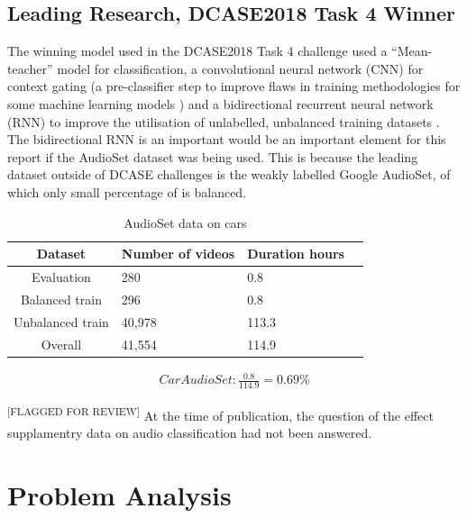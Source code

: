 \documentclass{UoNMCHA}
\newcommand{\flagforreview}{\textsuperscript{\color{red} [FLAGGED FOR REVIEW]}}
\numberwithin{equation}{section}
\begin{document}
\subsection{Leading Research, DCASE2018 Task 4 Winner}
The winning model used in the DCASE2018 Task 4 challenge used a “Mean-teacher” model for classification, a convolutional neural network (CNN) for context gating (a pre-classifier step to improve flaws in training methodologies for some machine learning models \cite{Yan16}) and a bidirectional recurrent neural network (RNN) to improve the utilisation of unlabelled, unbalanced training datasets \cite{winners}. The bidirectional RNN is an important would be an important element for this report if the AudioSet dataset was being used. This is because the leading dataset outside of DCASE challenges is the weakly labelled Google AudioSet, of which only small percentage of is balanced.

\begin{table}[h!]
    \begin{center}
        \caption{AudioSet data on cars}\label{tab:AudioSetCars}
        {\footnotesize
            \begin{tabular}{c l l l|}
                \hline\hline Dataset & Number of videos & Duration hours \\ \hline 
                Evaluation & 280 & 0.8 \\
                Balanced train & 296 & 0.8 \\
                Unbalanced train & 40,978 & 113.3 \\
                Overall & 41,554 & 114.9 \\
                \hline
            \end{tabular}
        }
    \end{center}
\end{table}
\begin{gather*}
    Car AudioSet:  \frac{0.8}{114.9}=0.69\%
\end{gather*}



\flagforreview
At the time of publication, the question of the effect supplamentry data on audio classification had not been answered.





\clearpage \section{Problem Analysis}\label{sec:ProblemAnalysis}
\end{document}
